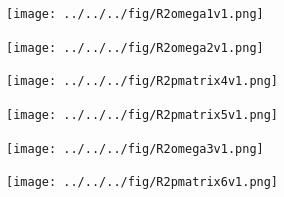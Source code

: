 \documentclass[dvipdfmx, fleqn, uplatex, a4paper]{jsarticle}
\begin{document}
\vspace{2cm}

\begin{figure}[H]
 \begin{minipage}{0.5\hsize}
  \begin{center}
   \texttt{[image: ../../../fig/R2omega1v1.png]}
  \end{center}
 \end{minipage}
 \begin{minipage}{0.5\hsize}
  \begin{center}
   \texttt{[image: ../../../fig/R2omega2v1.png]}
  \end{center}
 \end{minipage}
\end{figure}

\vspace{-1cm}

\begin{figure}[H]
 \begin{minipage}{0.5\hsize}
  \begin{center}
   \texttt{[image: ../../../fig/R2pmatrix4v1.png]}
  \end{center}
 \end{minipage}
 \begin{minipage}{0.5\hsize}
  \begin{center}
   \texttt{[image: ../../../fig/R2pmatrix5v1.png]}
  \end{center}
 \end{minipage}
\end{figure}

\begin{figure}[H]
 \begin{minipage}{0.5\hsize}
  \begin{center}
   \texttt{[image: ../../../fig/R2omega3v1.png]}
  \end{center}
 \end{minipage}
 \begin{minipage}{0.5\hsize}
 \end{minipage}
\end{figure}

\vspace{-1cm}

\begin{figure}[H]
 \begin{minipage}{0.5\hsize}
  \begin{center}
   \texttt{[image: ../../../fig/R2pmatrix6v1.png]}
  \end{center}
 \end{minipage}
 \begin{minipage}{0.5\hsize}
 \end{minipage}
\end{figure}
\end{document}
